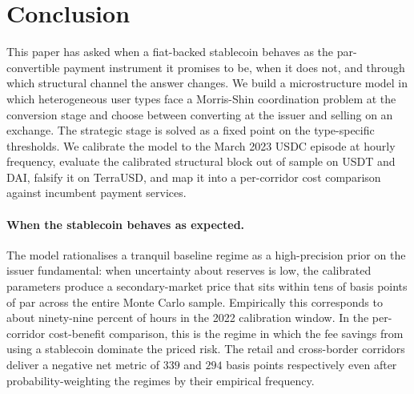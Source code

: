 \section{Conclusion}\label{sec:conclusion}

This paper has asked when a fiat-backed stablecoin behaves as the par-convertible payment instrument it promises to be, when it does not, and through which structural channel the answer changes. We build a microstructure model in which heterogeneous user types face a Morris-Shin coordination problem at the conversion stage and choose between converting at the issuer and selling on an exchange. The strategic stage is solved as a fixed point on the type-specific thresholds. We calibrate the model to the March 2023 USDC episode at hourly frequency, evaluate the calibrated structural block out of sample on USDT and DAI, falsify it on TerraUSD, and map it into a per-corridor cost comparison against incumbent payment services.

\paragraph{When the stablecoin behaves as expected.} The model rationalises a tranquil baseline regime as a high-precision prior on the issuer fundamental: when uncertainty about reserves is low, the calibrated parameters produce a secondary-market price that sits within tens of basis points of par across the entire Monte Carlo sample. Empirically this corresponds to about ninety-nine percent of hours in the 2022 calibration window. In the per-corridor cost-benefit comparison, this is the regime in which the fee savings from using a stablecoin dominate the priced risk. The retail and cross-border corridors deliver a negative net metric of $339$ and $294$ basis points respectively even after probability-weighting the regimes by their empirical frequency.


